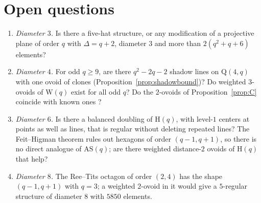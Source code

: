 \documentclass[11pt]{amsart}
\theoremstyle{definition}
\theoremstyle{remark}
\newcommand{\Hq}{\mathrm{H}}
\newcommand{\AS}{\mathrm{AS}}
\newcommand{\Wq}{\mathrm{W}}
\newcommand{\Qf}{\mathrm{Q}}
\begin{document}
\section{Open questions}\label{sec:open}
\begin{enumerate}[leftmargin=1.5em]
\item \emph{Diameter $3$.} Is there a five-hat structure, or any modification of a projective plane of order $q$ with $\Delta=q+2$, diameter $3$ and more than $2(q^2+q+6)$ elements?
\item \emph{Diameter $4$.} For odd $q\ge9$, are there $q^2-2q-2$ shadow lines on $\Qf(4,q)$ with one ovoid of clones (Proposition~\ref{prop:shadowbound})? Do weighted $3$-ovoids of $\Wq(q)$ exist for all odd $q$? Do the $2$-ovoids of Proposition~\ref{prop:C} coincide with known ones \cite{BLP09,CCEM08}?
\item \emph{Diameter $6$.} Is there a balanced doubling of $\Hq(q)$, with level-$1$ centers at points as well as lines, that is regular without deleting repeated lines? The Feit--Higman theorem rules out hexagons of order $(q-1,q+1)$, so there is no direct analogue of $\AS(q)$; are there weighted distance-$2$ ovoids of $\Hq(q)$ that help?
\item \emph{Diameter $8$.} The Ree--Tits octagon of order $(2,4)$ has the shape $(q-1,q+1)$ with $q=3$; a weighted $2$-ovoid in it would give a $5$-regular structure of diameter $8$ with $5850$ elements.
\end{enumerate}

\appendix
\end{document}
